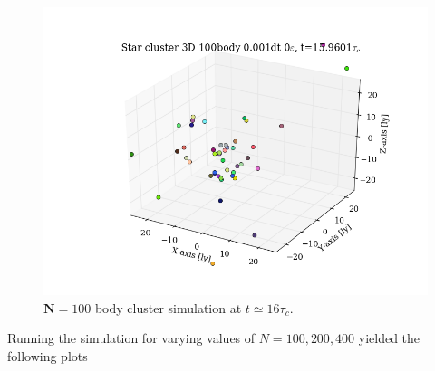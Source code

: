 \documentclass[11pt,a4paper,notitlepage,twocolumn]{article}
\begin{document}
\begin{figure}
[H]\center
\includegraphics[scale=0.35]{../moviefigs/ClusterPos_100body_dt1_eps0_dur16_movie400.png}
\caption{$\mathbf{N} = 100$ body cluster simulation at $t \simeq 16\tau_c$.}
\end{figure}

Running the simulation for varying values of $N = 100, 200, 400$ yielded the following plots \newpage
\end{document}
